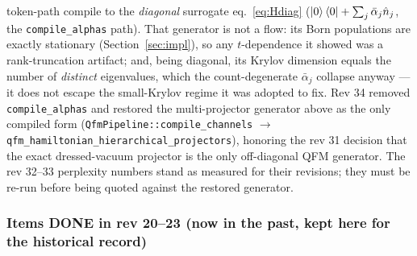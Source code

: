 \documentclass[11pt, a4paper]{article}
\begin{document}
\begin{enumerate}
  token-path compile to the \emph{diagonal} surrogate
  eq.~\eqref{eq:Hdiag}
  ($\ket{0}\bra{0}+\sum_j\bar\alpha_j\hat n_j$, the
  \texttt{compile\_alphas} path). That generator is not a flow:
  its Born populations are exactly stationary
  (Section~\ref{sec:impl}), so any $t$-dependence it showed was a
  rank-truncation artifact; and, being diagonal, its Krylov
  dimension equals the number of \emph{distinct} eigenvalues,
  which the count-degenerate $\bar\alpha_j$ collapse anyway ---
  it does not escape the small-Krylov regime it was adopted to
  fix. Rev 34 removed \texttt{compile\_alphas} and restored the
  multi-projector generator above as the only compiled form
  (\texttt{QfmPipeline::compile\_channels}
  $\to$ \texttt{qfm\_hamiltonian\_hierarchical\_projectors}),
  honoring the rev 31 decision that the exact dressed-vacuum
  projector is the only off-diagonal QFM generator. The rev
  32--33 perplexity numbers stand as measured for their
  revisions; they must be re-run before being quoted against the
  restored generator.
\end{enumerate}

\subsubsection*{Items DONE in rev 20--23 (now in the past, kept here for the historical record)}
\end{document}

